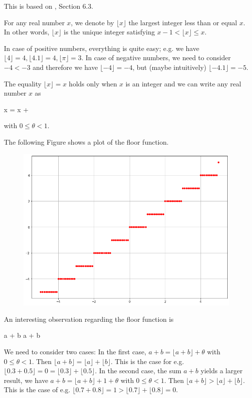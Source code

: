 
This is based on \cite{Burton2011}, Section 6.3.

For any real number $x$, we denote by $\lfloor x \rfloor$ the largest integer less than or equal $x$. In other words, $\lfloor x \rfloor$ is the unique integer satisfying $x-1 < \lfloor x \rfloor \leq x$.

In case of positive numbers, everything is quite easy; e.g. we have $\lfloor 4 \rfloor = 4, \lfloor 4.1 \rfloor = 4, \lfloor \pi \rfloor = 3$. In case of negative numbers, we need to consider $-4 < -3$ and therefore we have $\lfloor -4 \rfloor = -4$, but (maybe intuitively) $\lfloor -4.1 \rfloor = -5$.

The equality $\lfloor x \rfloor = x$ holds only when $x$ is an integer and we can write any real number $x$ as

\bee
x = \lfloor x \rfloor + \theta
\eee

with $0 \leq \theta < 1$.

The following Figure shows a plot of the floor function.

\begin{figure}[H]
    \centering
    \includegraphics[scale=0.5]{images/floor_function.png}
\end{figure}


An interesting observation regarding the floor function is

\bee
\lfloor a + b \rfloor \geq \lfloor a \rfloor + \lfloor b \rfloor
\eee

We need to consider two cases: In the first case, $a + b = \lfloor a + b \rfloor + \theta$ with $0 \leq \theta < 1$. Then $\lfloor a+b \rfloor = \lfloor a \rfloor + \lfloor b \rfloor$. This is the case for e.g. $\lfloor 0.3 + 0.5 \rfloor = 0 = \lfloor 0.3 \rfloor + \lfloor 0.5 \rfloor$. In the second case, the sum $a + b$ yields a larger result, we have $a + b = \lfloor a + b\rfloor + 1 + \theta$ with $0 \leq \theta < 1$. Then $\lfloor a + b \rfloor > \lfloor a \rfloor + \lfloor b \rfloor$. This is the case of e.g. $\lfloor 0.7 + 0.8 \rfloor = 1 > \lfloor 0.7 \rfloor + \lfloor 0.8 \rfloor = 0$.

